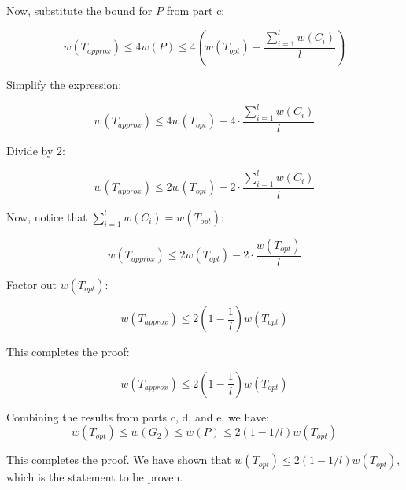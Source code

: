 Now, substitute the bound for \(P\) from part c:

\[w(T_{approx}) \leq 4 w(P) \leq 4 \left( w(T_{opt}) - \frac{ \sum^{l}_{i=1} w(C_i) }{l} \right)\]

Simplify the expression:

\[w(T_{approx}) \leq 4 w(T_{opt}) - 4 \cdot \frac{ \sum^{l}_{i=1} w(C_i) }{l}\]

Divide by 2:

\[w(T_{approx}) \leq 2 w(T_{opt}) - 2 \cdot \frac{ \sum^{l}_{i=1} w(C_i) }{l}\]

Now, notice that \(\sum^{l}_{i=1} w(C_i) = w(T_{opt})\):

\[w(T_{approx}) \leq 2 w(T_{opt}) - 2 \cdot \frac{w(T_{opt})}{l}\]

Factor out \(w(T_{opt})\):

\[w(T_{approx}) \leq 2(1 - \frac{1}{l}) w(T_{opt})\]

This completes the proof:

\[w(T_{approx}) \leq 2(1 - \frac{1}{l}) w(T_{opt})\]

Combining the results from parts c, d, and e, we have:
\[ w(T_{opt}) \leq w(G_2) \leq w(P) \leq 2(1 - 1/l)w(T_{opt}) \]

This completes the proof. We have shown that \(w(T_{opt}) \leq 2(1 - 1/l)w(T_{opt})\), which is the statement to be proven.
